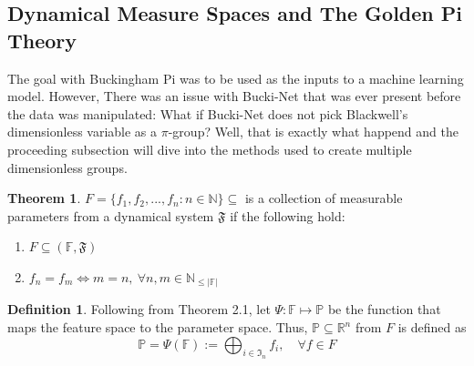 \documentclass{article}
\theoremstyle{definition}
\newtheorem{definition}{Definition}[section]
\newtheorem{theorem}{Theorem}[section]
\begin{document}
\subsection{Dynamical Measure Spaces and The Golden Pi Theory}
The goal with Buckingham Pi was to be used as the inputs to a machine learning model. However, There was an issue with Bucki-Net that was ever present before the data was manipulated: What if Bucki-Net does not pick Blackwell's dimensionless variable as a $\pi$-group?  Well, that is exactly what happend and the proceeding subsection will dive into the methods used to create multiple dimensionless groups.  


\begin{theorem}
    
    $F = \{f_1, f_2, ..., f_n: n \in \mathbb{N}\} \subseteq{}$ is a collection of measurable parameters from a dynamical system $\mathfrak{F}$ if the following hold:
    \begin{enumerate}
        \item $F \subseteq (\mathbb{F}, \mathfrak{F})$

        \item $ f_n = f_m  \iff m = n, \ \forall n, m \in \mathbb{N}_{\leq |\mathbb{F}|}$ 
    \end{enumerate}
    
    
    
    
    

\end{theorem}

\begin{definition} 
    Following from Theorem 2.1, let $ \Psi: \mathbb{F} \mapsto \mathbb{P} $ be the function that maps the feature space to the parameter space. Thus, $\mathbb{P} \subseteq \mathbb{R}^{n}$ from $F$ is defined as \newline
    \[ \mathbb{P} =  \Psi(\mathbb{F}) :=
    \bigoplus_{i \in \mathfrak{I}_n}f_i, \quad \forall f \in F    \]

\end{definition} %
\end{document}
